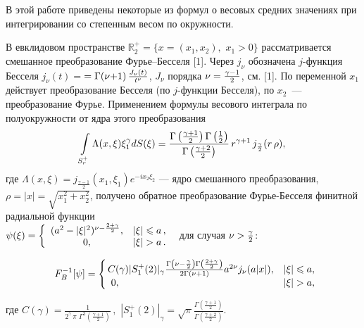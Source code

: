 


\vzmscaption

В этой работе приведены некоторые из формул о весовых средних значениях при интегрировании со степенным весом по окружности.

В евклидовом пространстве $\mathbb{R}_2^+=\{x=(x_1,x_2),\,\,x_1>0\}$
рассматривается смешанное преобразование Фу\-рье--Бес\-се\-ля [1].
Через $j_\nu$ обозначена $j$-функция Бесселя
$j_\nu(t)=
$\linebreak$
=
\Gamma(\nu{+}1)\,{J_\nu(t)\over t^\nu}$, $J_\nu$ порядка
$\nu={\gamma-1\over2}$, см. [1].
По  переменной $x_1$ действует преобразование Бесселя (по $j$-функции Бесселя), по $x_2$~--- преобразование Фурье.
Применением  формулы  весового интеграла по полуокружности от ядра этого преобразования
$$\int\limits_{S_r^+}{\Lambda(x,\xi)\xi_1^\gamma}dS(\xi)
=\frac{\Gamma\left(\gamma+1\over2\right)\Gamma\left(1\over2\right)}{\Gamma\left(\gamma+2\over2\right)}\,r^{\gamma+1}\,j_{\frac{\gamma}{2}}(r\,\rho),$$
где $\Lambda(x,\xi)=j_\frac{\gamma-1}{2}(x_1,\xi_1)e^{-ix_2\xi_2}$ --- ядро смешанного преобразования, $\rho=|x|=\sqrt{x_1^2+x_2^2}$,
получено обратное преобразование Фурье-Бесселя финитной радиальной функции\\ $\psi(\xi)=\left\{ \begin{array}{cc}
          (a^2-|\xi|^2)^{{\nu-{2+\gamma\over2}}} , & |\xi|\leqslant a\,, \\
					   0  ,& |\xi|>a\,.
\end{array}\right.\,\,$ для случая $\nu>{\gamma\over2}$:

\begin{multline*}
	F^{-1}_B[\psi]=
	\left\{\begin{array}{lc}
		\!\!C(\gamma)|S^+_1(2)|_\gamma\frac{\Gamma\left(\nu-\frac{\gamma}{2}\right)\Gamma\left(\frac{2+\gamma}{2}\right)}
		{2\Gamma\left(\nu+1\right)}a^{2\nu}
		j_{\nu}(a|x|), & |\xi|\leqslant a,\\
		0  ,& |\xi|>a,
	\end{array}\hspace{-1em}\right.
\end{multline*}

где $C(\gamma)=\frac{1}{2^{\gamma}\,\pi\,\,\Gamma^2\left(\frac{\gamma+1}{2}\right)}\,,$ $|S^+_1(2)|_\gamma=\sqrt{\pi}\frac{\Gamma(\frac{\gamma+1}{2})}{\Gamma(\frac{\gamma+2}{2})}.$

